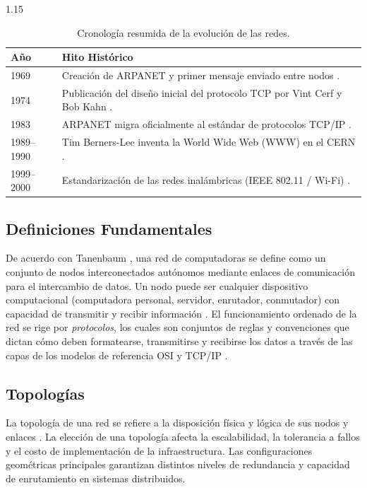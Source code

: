 \documentclass[11pt, a4paper]{article}
\begin{document}
\begin{spacing}{1.15}
\begin{table}[H]
    \centering
    \renewcommand{\arraystretch}{1.35}
    \begin{tabular}{|p{2.5cm}|p{12cm}|}
        \hline
        \textbf{Año} & \textbf{Hito Histórico} \\ \hline
        1969 & Creación de ARPANET y primer mensaje enviado entre nodos \cite{tanenbaum2021}. \\ \hline
        1974 & Publicación del diseño inicial del protocolo TCP por Vint Cerf y Bob Kahn \cite{kurose2017}. \\ \hline
        1983 & ARPANET migra oficialmente al estándar de protocolos TCP/IP \cite{stallings2014}. \\ \hline
        1989--1990 & Tim Berners-Lee inventa la World Wide Web (WWW) en el CERN \cite{forouzan2013}. \\ \hline
        1999--2000 & Estandarización de las redes inalámbricas (IEEE 802.11 / Wi-Fi) \cite{tanenbaum2021}. \\ \hline
    \end{tabular}
    \caption{Cronología resumida de la evolución de las redes.}
\end{table}

\subsection{Definiciones Fundamentales}
De acuerdo con Tanenbaum \cite{tanenbaum2021}, una red de computadoras se define como un conjunto de nodos interconectados autónomos mediante enlaces de comunicación para el intercambio de datos. Un nodo puede ser cualquier dispositivo computacional (computadora personal, servidor, enrutador, conmutador) con capacidad de transmitir y recibir información \cite{stallings2014}. El funcionamiento ordenado de la red se rige por \textit{protocolos}, los cuales son conjuntos de reglas y convenciones que dictan cómo deben formatearse, transmitirse y recibirse los datos a través de las capas de los modelos de referencia OSI y TCP/IP \cite{forouzan2013}.

\subsection{Topologías}
La topología de una red se refiere a la disposición física y lógica de sus nodos y enlaces \cite{forouzan2013}. La elección de una topología afecta la escalabilidad, la tolerancia a fallos y el costo de implementación de la infraestructura. Las configuraciones geométricas principales garantizan distintos niveles de redundancia y capacidad de enrutamiento en sistemas distribuidos.


\end{spacing}
\end{document}
